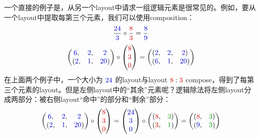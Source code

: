 \documentclass{article}
\begin{document}
一个直接的例子是，从另一个layout中请求一组逻辑元素是很常见的。例如，要从一个layout中提取每第三个元素，我们可以使用composition：
\[
\frac{\textcolor{blue}{24}}{\textcolor{blue}{3}} \circ \frac{\textcolor{red}{8}}{\textcolor{red}{3}} = \frac{\textcolor{blue}{8}}{\textcolor{blue}{9}}
\]
\[
\begin{pmatrix}
\textcolor{blue}{6}, & \textcolor{blue}{2}, & \textcolor{blue}{2} \\
(\textcolor{blue}{2}, & \textcolor{blue}{1}, & \textcolor{blue}{20})
\end{pmatrix} \circ \begin{pmatrix}
\textcolor{red}{8} \\
\textcolor{red}{3} \\
\textcolor{red}{0}
\end{pmatrix} = \begin{pmatrix}
(\textcolor{blue}{2}, & \textcolor{blue}{2}, & \textcolor{blue}{2}) \\
(\textcolor{blue}{6}, & \textcolor{blue}{1}, & \textcolor{blue}{20})
\end{pmatrix}
\]
在上面两个例子中，一个大小为 \( \textcolor{blue}{24} \) 的layout与layout \( \textcolor{red}{8} : \textcolor{red}{3} \) compose，得到了每第三个元素的layout。但是左侧layout中的“其余”元素呢？逻辑除法将左侧layout分成两部分：被右侧layout“命中”的部分和“剩余”部分：
\[
\begin{pmatrix}
\textcolor{blue}{6}, & \textcolor{blue}{2}, & \textcolor{blue}{2} \\
(\textcolor{blue}{2}, & \textcolor{blue}{1}, & \textcolor{blue}{20})
\end{pmatrix} \circ \begin{pmatrix}
\textcolor{red}{8} \\
\textcolor{red}{3} \\
\textcolor{red}{0}
\end{pmatrix} =
\begin{pmatrix}
\textcolor{blue}{24} \\
\textcolor{blue}{3} \\
\textcolor{blue}{0}
\end{pmatrix} \circ \begin{pmatrix}
(\textcolor{red}{8}, & \textcolor{green}{3}) \\
(\textcolor{red}{3}, & \textcolor{green}{1})
\end{pmatrix} =
\begin{pmatrix}
(\textcolor{red}{8}, & \textcolor{green}{3}) \\
(\textcolor{blue}{9}, & \textcolor{green}{3})
\end{pmatrix}
\]
\end{document}
